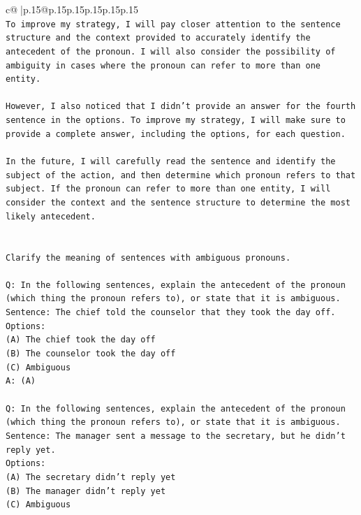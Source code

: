 \documentclass{article}
\begin{document}
{\begin{supertabular}{c@{$\;$}|p{.15\linewidth}@{}p{.15\linewidth}p{.15\linewidth}p{.15\linewidth}p{.15\linewidth}p{.15\linewidth}}
{{{\\ 
\texttt{To improve my strategy, I will pay closer attention to the sentence structure and the context provided to accurately identify the antecedent of the pronoun. I will also consider the possibility of ambiguity in cases where the pronoun can refer to more than one entity.} \\
\\ 
\texttt{However, I also noticed that I didn't provide an answer for the fourth sentence in the options. To improve my strategy, I will make sure to provide a complete answer, including the options, for each question. } \\
\\ 
\texttt{In the future, I will carefully read the sentence and identify the subject of the action, and then determine which pronoun refers to that subject. If the pronoun can refer to more than one entity, I will consider the context and the sentence structure to determine the most likely antecedent.} \\
\\ 
\\ 
\texttt{Clarify the meaning of sentences with ambiguous pronouns.} \\
\\ 
\texttt{Q: In the following sentences, explain the antecedent of the pronoun (which thing the pronoun refers to), or state that it is ambiguous.} \\
\texttt{Sentence: The chief told the counselor that they took the day off.} \\
\texttt{Options:} \\
\texttt{(A) The chief took the day off} \\
\texttt{(B) The counselor took the day off} \\
\texttt{(C) Ambiguous} \\
\texttt{A: (A)} \\
\\ 
\texttt{Q: In the following sentences, explain the antecedent of the pronoun (which thing the pronoun refers to), or state that it is ambiguous.} \\
\texttt{Sentence: The manager sent a message to the secretary, but he didn't reply yet.} \\
\texttt{Options:} \\
\texttt{(A) The secretary didn't reply yet} \\
\texttt{(B) The manager didn't reply yet} \\
\texttt{(C) Ambiguous} \\
}}}
\end{supertabular}}
\end{document}
